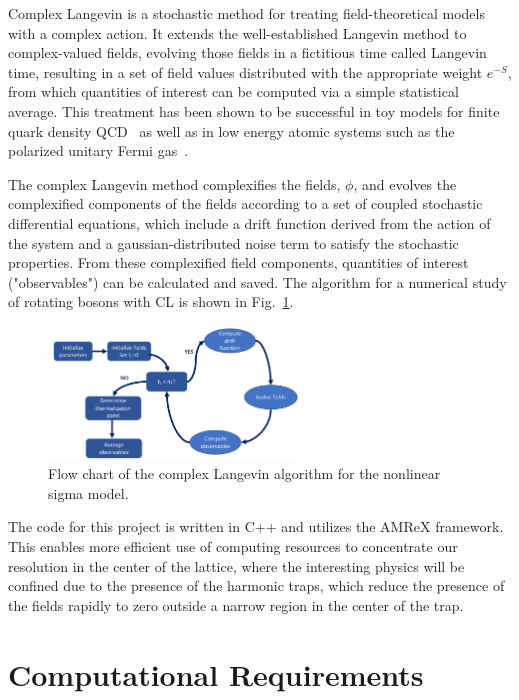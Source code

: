 \documentclass[onecolumn, 12pt]{report}
\begin{document}
Complex Langevin is a stochastic method for treating field-theoretical models with a complex action. It extends the well-established Langevin method to complex-valued fields, evolving those fields in a fictitious time called Langevin time, resulting in a set of field values distributed with the appropriate weight $e^{-S}$, from which quantities of interest can be computed via a simple statistical average. This treatment has been shown to be successful in toy models for finite quark density QCD~\cite{BergerCLReview} as well as in low energy atomic systems such as the polarized unitary Fermi gas~\cite{BergerCLReview}. 

The complex Langevin method complexifies the fields, $\phi$, and evolves the complexified components of the fields according to a set of coupled stochastic differential equations, which include a drift function derived from the action of the system and a gaussian-distributed noise term to satisfy the stochastic properties. From these complexified field components, quantities of interest ("observables") can be calculated and saved. The algorithm for a numerical study of rotating bosons with CL is shown in Fig.~\ref{Fig:Algorithm}.
%
\vspace{-3mm}
\begin{figure}[h]
\centering
\includegraphics[width=0.6\textwidth]{./algorithm.pdf}
\caption{\label{Fig:Algorithm} Flow chart of the complex Langevin algorithm for the nonlinear sigma model.\vspace{-3mm}}
\end{figure}
\vspace{-3mm}
%
The code for this project is written in C++ and utilizes the AMReX framework. This enables more efficient use of computing resources to concentrate our resolution in the center of the lattice, where the interesting physics will be confined due to the presence of the harmonic traps, which reduce the presence of the fields rapidly to zero outside a narrow region in the center of the trap.

\section{Computational Requirements}
\end{document}
